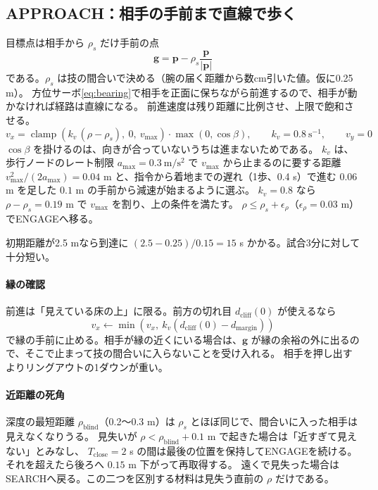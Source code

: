 \documentclass[a4paper,11pt]{ltjsarticle}
\newcommand{\vc}[1]{\bm{#1}}
\DeclareMathOperator{\clamp}{clamp}
\begin{document}
\subsection{APPROACH：相手の手前まで直線で歩く}

目標点は相手から $\rho_s$ だけ手前の点
\begin{equation}
\vc g=\vc p-\rho_s\frac{\vc p}{|\vc p|}
\label{eq:goal}
\end{equation}
である。$\rho_s$ は技の間合いで決める（腕の届く距離から数cm引いた値。仮に0.25 m）。
方位サーボ\eqref{eq:bearing}で相手を正面に保ちながら前進するので、相手が動かなければ経路は直線になる。
前進速度は残り距離に比例させ、上限で飽和させる。
\begin{equation}
v_x=\clamp\!\left(k_v\,(\rho-\rho_s),\ 0,\ v_{\max}\right)\cdot\max\!\left(0,\cos\beta\right),\qquad
k_v=0.8\ \mathrm{s^{-1}},\qquad v_y=0
\label{eq:approach}
\end{equation}
$\cos\beta$ を掛けるのは、向きが合っていないうちは進まないためである。
$k_v$ は、歩行ノードのレート制限 $a_{\max}=0.3\ \mathrm{m/s^2}$ で $v_{\max}$ から止まるのに要する距離
$v_{\max}^2/(2a_{\max})=0.04$ m と、指令から着地までの遅れ（1歩、0.4 s）で進む $0.06$ m を足した $0.1$ m の手前から減速が始まるように選ぶ。
$k_v=0.8$ なら $\rho-\rho_s=0.19$ m で $v_{\max}$ を割り、上の条件を満たす。
$\rho\le\rho_s+\epsilon_\rho$（$\epsilon_\rho=0.03$ m）でENGAGEへ移る。

初期距離が2.5 mなら到達に $(2.5-0.25)/0.15=15$ s かかる。試合3分に対して十分短い。

\paragraph{縁の確認}
前進は「見えている床の上」に限る。前方の切れ目 $d_\mathrm{cliff}(0)$ が使えるなら
\begin{equation}
v_x\leftarrow\min\!\left(v_x,\ k_v\left(d_\mathrm{cliff}(0)-d_\mathrm{margin}\right)\right)
\label{eq:cliff-limit}
\end{equation}
で縁の手前に止める。相手が縁の近くにいる場合は、$\vc g$ が縁の余裕の外に出るので、そこで止まって技の間合いに入らないことを受け入れる。
相手を押し出すよりリングアウトの1ダウンが重い。

\paragraph{近距離の死角}
深度の最短距離 $\rho_\mathrm{blind}$（0.2〜0.3 m）は $\rho_s$ とほぼ同じで、間合いに入った相手は見えなくなりうる。
見失いが $\rho<\rho_\mathrm{blind}+0.1$ m で起きた場合は「近すぎて見えない」とみなし、
$T_\mathrm{close}=2$ s の間は最後の位置を保持してENGAGEを続ける。それを超えたら後ろへ $0.15$ m 下がって再取得する。
遠くで見失った場合はSEARCHへ戻る。この二つを区別する材料は見失う直前の $\rho$ だけである。
\end{document}
